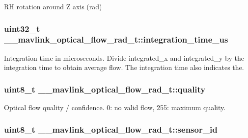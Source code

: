 R\+H rotation around Z axis (rad) 

\hypertarget{struct____mavlink__optical__flow__rad__t_a71280c6e42fe0c2a7590b8ac54275070}{
\subsubsection[{integration\+\_\+time\+\_\+us}]{\setlength{\rightskip}{0pt plus 5cm}uint32\+\_\+t \+\_\+\+\_\+mavlink\+\_\+optical\+\_\+flow\+\_\+rad\+\_\+t\+::integration\+\_\+time\+\_\+us}}\label{struct____mavlink__optical__flow__rad__t_a71280c6e42fe0c2a7590b8ac54275070}


Integration time in microseconds. Divide integrated\+\_\+x and integrated\+\_\+y by the integration time to obtain average flow. The integration time also indicates the. 

\hypertarget{struct____mavlink__optical__flow__rad__t_a35206139e7148b28cabf4e12977ad315}{
\subsubsection[{quality}]{\setlength{\rightskip}{0pt plus 5cm}uint8\+\_\+t \+\_\+\+\_\+mavlink\+\_\+optical\+\_\+flow\+\_\+rad\+\_\+t\+::quality}}\label{struct____mavlink__optical__flow__rad__t_a35206139e7148b28cabf4e12977ad315}


Optical flow quality / confidence. 0\+: no valid flow, 255\+: maximum quality. 

\hypertarget{struct____mavlink__optical__flow__rad__t_a1aba9a5b85e33d09f1161661d95376c1}{
\subsubsection[{sensor\+\_\+id}]{\setlength{\rightskip}{0pt plus 5cm}uint8\+\_\+t \+\_\+\+\_\+mavlink\+\_\+optical\+\_\+flow\+\_\+rad\+\_\+t\+::sensor\+\_\+id}}\label{struct____mavlink__optical__flow__rad__t_a1aba9a5b85e33d09f1161661d95376c1}


